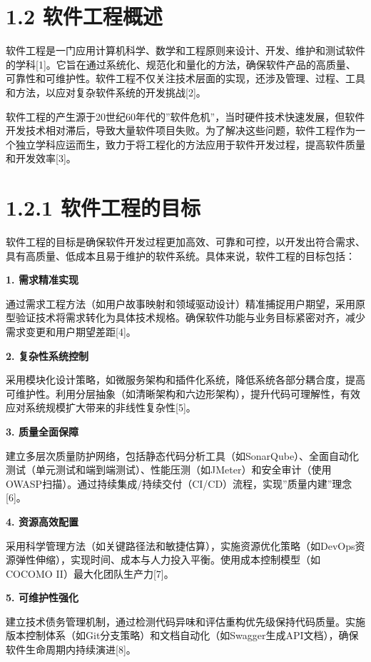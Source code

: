 \documentclass[12pt,a4paper]{ctexbook}
\begin{document}
\section{1.2 软件工程概述}\label{ux8f6fux4ef6ux5de5ux7a0bux6982ux8ff0}

软件工程是一门应用计算机科学、数学和工程原则来设计、开发、维护和测试软件的学科{[}1{]}。它旨在通过系统化、规范化和量化的方法，确保软件产品的高质量、可靠性和可维护性。软件工程不仅关注技术层面的实现，还涉及管理、过程、工具和方法，以应对复杂软件系统的开发挑战{[}2{]}。

软件工程的产生源于20世纪60年代的''软件危机''，当时硬件技术快速发展，但软件开发技术相对滞后，导致大量软件项目失败。为了解决这些问题，软件工程作为一个独立学科应运而生，致力于将工程化的方法应用于软件开发过程，提高软件质量和开发效率{[}3{]}。


\section{1.2.1
软件工程的目标}\label{ux8f6fux4ef6ux5de5ux7a0bux7684ux76eeux6807}

软件工程的目标是确保软件开发过程更加高效、可靠和可控，以开发出符合需求、具有高质量、低成本且易于维护的软件系统。具体来说，软件工程的目标包括：

\textbf{1. 需求精准实现}

通过需求工程方法（如用户故事映射和领域驱动设计）精准捕捉用户期望，采用原型验证技术将需求转化为具体技术规格。确保软件功能与业务目标紧密对齐，减少需求变更和用户期望差距{[}4{]}。

\textbf{2. 复杂性系统控制}

采用模块化设计策略，如微服务架构和插件化系统，降低系统各部分耦合度，提高可维护性。利用分层抽象（如清晰架构和六边形架构），提升代码可理解性，有效应对系统规模扩大带来的非线性复杂性{[}5{]}。

\textbf{3. 质量全面保障}

建立多层次质量防护网络，包括静态代码分析工具（如SonarQube）、全面自动化测试（单元测试和端到端测试）、性能压测（如JMeter）和安全审计（使用OWASP扫描）。通过持续集成/持续交付（CI/CD）流程，实现''质量内建''理念{[}6{]}。

\textbf{4. 资源高效配置}

采用科学管理方法（如关键路径法和敏捷估算），实施资源优化策略（如DevOps资源弹性伸缩），实现时间、成本与人力投入平衡。使用成本控制模型（如COCOMO
II）最大化团队生产力{[}7{]}。

\textbf{5. 可维护性强化}

建立技术债务管理机制，通过检测代码异味和评估重构优先级保持代码质量。实施版本控制体系（如Git分支策略）和文档自动化（如Swagger生成API文档），确保软件生命周期内持续演进{[}8{]}。
\end{document}
